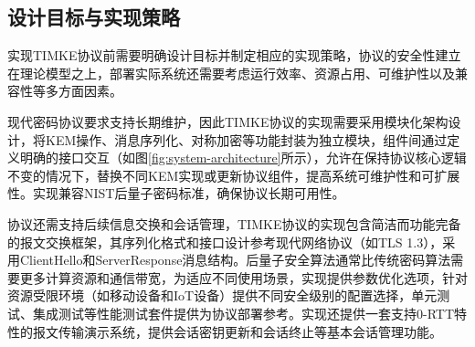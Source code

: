 \subsection{设计目标与实现策略}

实现TIMKE协议前需要明确设计目标并制定相应的实现策略，协议的安全性建立在理论模型之上，部署实际系统还需要考虑运行效率、资源占用、可维护性以及兼容性等多方面因素。

现代密码协议要求支持长期维护，因此TIMKE协议的实现需要采用模块化架构设计，将KEM操作、消息序列化、对称加密等功能封装为独立模块，组件间通过定义明确的接口交互（如图\ref{fig:system-architecture}所示），允许在保持协议核心逻辑不变的情况下，替换不同KEM实现或更新协议组件，提高系统可维护性和可扩展性。实现兼容NIST后量子密码标准，确保协议长期可用性。

协议还需支持后续信息交换和会话管理，TIMKE协议的实现包含简洁而功能完备的报文交换框架，其序列化格式和接口设计参考现代网络协议（如TLS 1.3），采用ClientHello和ServerResponse消息结构。后量子安全算法通常比传统密码算法需要更多计算资源和通信带宽，为适应不同使用场景，实现提供参数优化选项，针对资源受限环境（如移动设备和IoT设备）提供不同安全级别的配置选择，单元测试、集成测试等性能测试套件提供为协议部署参考。实现还提供一套支持0-RTT特性的报文传输演示系统，提供会话密钥更新和会话终止等基本会话管理功能。
